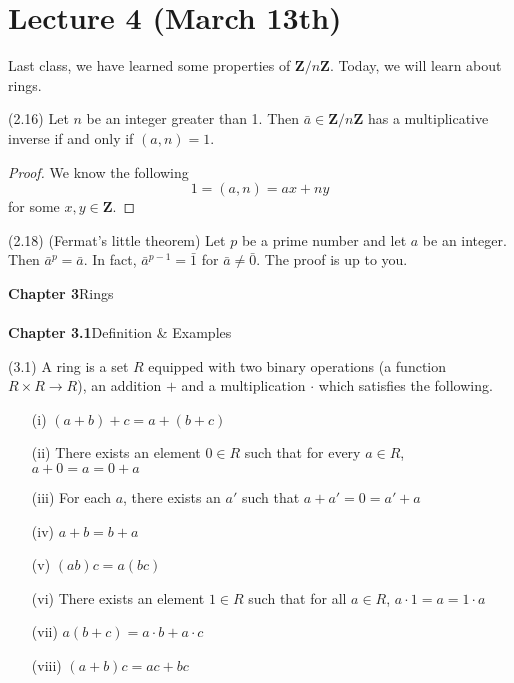 \section{Lecture 4 (March 13th)}

Last class, we have learned some properties of ${\bm Z}/n{\bm Z}$. Today, we will learn about rings.
\\
\begin{prop}
(2.16) Let $n$ be an integer greater than 1. Then $\bar{a} \in {\bm Z}/n{\bm Z}$ has a multiplicative inverse if and only if $(a,n)=1$.
\end{prop}
\vspace{2ex}
\begin{proof}
We know the following
\[1=(a,n)=ax+ny\]
for some $x,y\in {\bm Z}$. 
\end{proof}
\vspace{2ex}
\begin{thm}
(2.18) (Fermat's little theorem) Let $p$ be a prime number and let $a$ be an integer. Then $\bar{a}^{p}=\bar{a}$. In fact, $\bar{a}^{p-1}=\bar{1}$ for $\bar{a}\ne \bar{0}$. The proof is up to you.
\end{thm}
\vspace{2ex}
{\bf Chapter 3}\hspace{2ex}Rings
\\\\
{\bf Chapter 3.1}\hspace{2ex}Definition \& Examples
\\
\begin{defi}
 (3.1) A ring is a set $R$ equipped with two binary operations (a function $R\times R\rightarrow R$), an addition $+$ and a multiplication $\cdot $ which satisfies the following.
 \begin{itemize}
	 \item[(i)] $(a+b)+c=a+(b+c)$
	 \item[(ii)] There exists an element $0\in R$ such that for every $a\in R$, $a+0=a=0+a$
	 \item[(iii)] For each $a$, there exists an $a'$ such that $a+a'=0=a'+a$
	 \item[(iv)] $a+b=b+a$
	 \item[(v)] $(ab)c=a(bc)$
	 \item[(vi)] There exists an element $1\in R$ such that for all $a\in R$, $a\cdot 1=a=1\cdot a$
	 \item[(vii)] $a(b+c)=a\cdot b+a\cdot c$
	 \item[(viii)] $(a+b)c=ac+bc$
 \end{itemize}
\end{defi}
